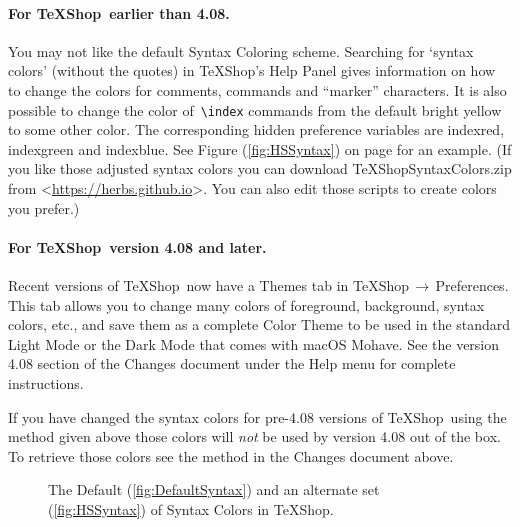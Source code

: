 \documentclass[letterpaper,11pt]{article}
\newcommand{\TS}{\textsf{\TeX Shop}}
\newcommand{\cmd}[1]{\textsf{#1}}
\newcommand{\mnu}[1]{\textsf{#1}}
\newcommand{\To}{\,\(\to\)\,}
\begin{document}
\paragraph{For \TS\ earlier than 4.08.}
You may not like the default Syntax Coloring scheme. Searching for `\cmd{syntax colors}' (without the quotes) in \TS's Help Panel gives information on how to change the colors for comments, commands and ``marker'' characters. It is also possible to change the color of\, \verb"\index" commands from the default bright yellow to some other color. The corresponding hidden preference variables are \cmd{indexred}, \cmd{indexgreen} and \cmd{indexblue}. See Figure (\ref{fig:HSSyntax}) on page \pageref{fig:HSSyntax} for an example. (If you like those adjusted syntax colors you can download \cmd{TeXShopSyntaxColors.zip} from <\url{https://herbs.github.io}>. You can also edit those scripts to create colors you prefer.)

\paragraph{For \TS\ version 4.08 and later.}
Recent versions of \TS\ now have a \cmd{Themes} tab in \mnu{\TS}\To\mnu{Preferences}. This tab allows you to change many colors of foreground, background, syntax colors, etc., and save them as a complete Color Theme to be used in the standard Light Mode or the Dark Mode that comes with \cmd{macOS Mohave}. See the version 4.08 section of the \cmd{Changes} document under the \mnu{Help} menu for complete instructions.

If you have changed the syntax colors for pre-4.08 versions of \TS\ using the method given above those colors will \emph{not} be used by version 4.08 out of the box. To retrieve those colors see the method in the \cmd{Changes} document above.
\begin{figure}
\centering
{}%
\qquad%
%
\caption[\TS\ Syntax Colors]{The Default (\ref{fig:DefaultSyntax}) and an alternate set (\ref{fig:HSSyntax}) of Syntax Colors in \TS.}
\label{fig:SyntaxColors}
\end{figure}
\end{document}
